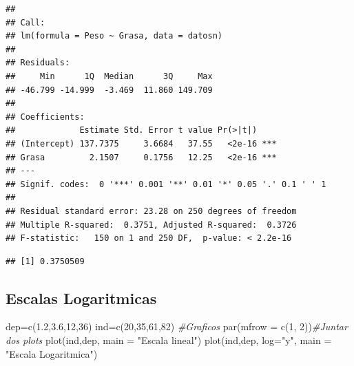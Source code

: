 \documentclass[
]{article}
\newenvironment{Shaded}{\begin{snugshade}}{\end{snugshade}}
\newcommand{\AttributeTok}[1]{\textcolor[rgb]{0.77,0.63,0.00}{#1}}
\newcommand{\CommentTok}[1]{\textcolor[rgb]{0.56,0.35,0.01}{\textit{#1}}}
\newcommand{\DecValTok}[1]{\textcolor[rgb]{0.00,0.00,0.81}{#1}}
\newcommand{\FloatTok}[1]{\textcolor[rgb]{0.00,0.00,0.81}{#1}}
\newcommand{\FunctionTok}[1]{\textcolor[rgb]{0.00,0.00,0.00}{#1}}
\newcommand{\NormalTok}[1]{#1}
\newcommand{\OtherTok}[1]{\textcolor[rgb]{0.56,0.35,0.01}{#1}}
\newcommand{\SpecialCharTok}[1]{\textcolor[rgb]{0.00,0.00,0.00}{#1}}
\newcommand{\StringTok}[1]{\textcolor[rgb]{0.31,0.60,0.02}{#1}}
\begin{document}
\begin{verbatim}
## 
## Call:
## lm(formula = Peso ~ Grasa, data = datosn)
## 
## Residuals:
##     Min      1Q  Median      3Q     Max 
## -46.799 -14.999  -3.469  11.860 149.709 
## 
## Coefficients:
##             Estimate Std. Error t value Pr(>|t|)    
## (Intercept) 137.7375     3.6684   37.55   <2e-16 ***
## Grasa         2.1507     0.1756   12.25   <2e-16 ***
## ---
## Signif. codes:  0 '***' 0.001 '**' 0.01 '*' 0.05 '.' 0.1 ' ' 1
## 
## Residual standard error: 23.28 on 250 degrees of freedom
## Multiple R-squared:  0.3751, Adjusted R-squared:  0.3726 
## F-statistic:   150 on 1 and 250 DF,  p-value: < 2.2e-16
\end{verbatim}

\begin{Shaded}
\end{Shaded}

\begin{verbatim}
## [1] 0.3750509
\end{verbatim}

\hypertarget{escalas-logaritmicas}{%
\subsection{Escalas Logaritmicas}\label{escalas-logaritmicas}}

\begin{Shaded}
\begin{Highlighting}[]
\NormalTok{dep}\OtherTok{=}\FunctionTok{c}\NormalTok{(}\FloatTok{1.2}\NormalTok{,}\FloatTok{3.6}\NormalTok{,}\DecValTok{12}\NormalTok{,}\DecValTok{36}\NormalTok{)}
\NormalTok{ind}\OtherTok{=}\FunctionTok{c}\NormalTok{(}\DecValTok{20}\NormalTok{,}\DecValTok{35}\NormalTok{,}\DecValTok{61}\NormalTok{,}\DecValTok{82}\NormalTok{)}
\CommentTok{\#Graficos}
\FunctionTok{par}\NormalTok{(}\AttributeTok{mfrow =} \FunctionTok{c}\NormalTok{(}\DecValTok{1}\NormalTok{, }\DecValTok{2}\NormalTok{))}\CommentTok{\#Juntar dos plots}
\FunctionTok{plot}\NormalTok{(ind,dep, }\AttributeTok{main =} \StringTok{"Escala lineal"}\NormalTok{)}
\FunctionTok{plot}\NormalTok{(ind,dep, }\AttributeTok{log=}\StringTok{"y"}\NormalTok{, }\AttributeTok{main =} \StringTok{"Escala Logaritmica"}\NormalTok{)}
\end{Highlighting}
\end{Shaded}
\end{document}
